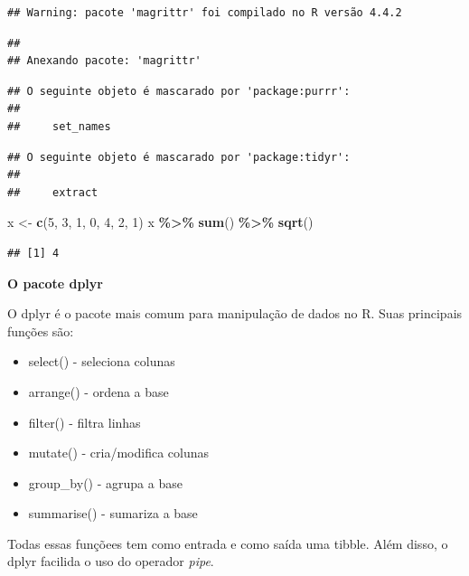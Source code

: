 \documentclass[
]{book}
\newenvironment{Shaded}{\begin{snugshade}}{\end{snugshade}}
\newcommand{\DecValTok}[1]{\textcolor[rgb]{0.00,0.00,0.81}{#1}}
\newcommand{\FunctionTok}[1]{\textcolor[rgb]{0.13,0.29,0.53}{\textbf{#1}}}
\newcommand{\NormalTok}[1]{#1}
\newcommand{\OtherTok}[1]{\textcolor[rgb]{0.56,0.35,0.01}{#1}}
\newcommand{\SpecialCharTok}[1]{\textcolor[rgb]{0.81,0.36,0.00}{\textbf{#1}}}
\providecommand{\tightlist}{%
  \setlength{\itemsep}{0pt}\setlength{\parskip}{0pt}}
\begin{document}
\begin{verbatim}
## Warning: pacote 'magrittr' foi compilado no R versão 4.4.2
\end{verbatim}

\begin{verbatim}
## 
## Anexando pacote: 'magrittr'
\end{verbatim}

\begin{verbatim}
## O seguinte objeto é mascarado por 'package:purrr':
## 
##     set_names
\end{verbatim}

\begin{verbatim}
## O seguinte objeto é mascarado por 'package:tidyr':
## 
##     extract
\end{verbatim}

\begin{Shaded}
\begin{Highlighting}[]
\NormalTok{x }\OtherTok{\textless{}{-}} \FunctionTok{c}\NormalTok{(}\DecValTok{5}\NormalTok{, }\DecValTok{3}\NormalTok{, }\DecValTok{1}\NormalTok{, }\DecValTok{0}\NormalTok{, }\DecValTok{4}\NormalTok{, }\DecValTok{2}\NormalTok{, }\DecValTok{1}\NormalTok{)}
\NormalTok{x }\SpecialCharTok{\%\textgreater{}\%} \FunctionTok{sum}\NormalTok{() }\SpecialCharTok{\%\textgreater{}\%} \FunctionTok{sqrt}\NormalTok{()}
\end{Highlighting}
\end{Shaded}

\begin{verbatim}
## [1] 4
\end{verbatim}

\textbf{O pacote dplyr}

O dplyr é o pacote mais comum para manipulação de dados no R. Suas principais funções são:

\begin{itemize}
\tightlist
\item
  select() - seleciona colunas
\item
  arrange() - ordena a base
\item
  filter() - filtra linhas
\item
  mutate() - cria/modifica colunas
\item
  group\_by() - agrupa a base
\item
  summarise() - sumariza a base
\end{itemize}

Todas essas funçõees tem como entrada e como saída uma tibble. Além disso, o dplyr facilida o uso do operador \emph{pipe}.
\end{document}

